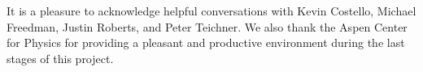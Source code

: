 \documentclass{pnastwo}
\begin{document}
\begin{article}





\begin{acknowledgments}
It is a pleasure to acknowledge helpful conversations with 
Kevin Costello,
Michael Freedman,
Justin Roberts,
and
Peter Teichner.
We also thank the Aspen Center for Physics for providing a pleasant and productive
environment during the last stages of this project.
\end{acknowledgments}









%


\end{article}
\end{document}
